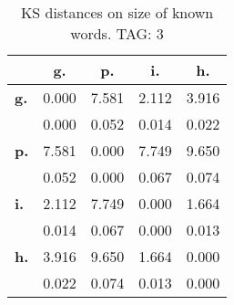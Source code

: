 \begin{table}[h!]
\begin{center}
\begin{tabular}{| l || c | c | c | c |}\hline
 & {\bf g.} & {\bf p.} & {\bf i.} & {\bf h.} \\\hline\hline
{\bf g.} & 0.000 & 7.581 & 2.112 & 3.916 \\
{\bf } & 0.000 & 0.052 & 0.014 & 0.022 \\\hline
{\bf p.} & 7.581 & 0.000 & 7.749 & 9.650 \\
{\bf } & 0.052 & 0.000 & 0.067 & 0.074 \\\hline
{\bf i.} & 2.112 & 7.749 & 0.000 & 1.664 \\
{\bf } & 0.014 & 0.067 & 0.000 & 0.013 \\\hline
{\bf h.} & 3.916 & 9.650 & 1.664 & 0.000 \\
{\bf } & 0.022 & 0.074 & 0.013 & 0.000 \\\hline
\end{tabular}
\caption{KS distances on size of known words. TAG: 3}
\end{center}
\end{table}